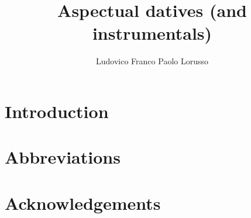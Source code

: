 \documentclass[output=paper]{langsci/langscibook}
\author{Ludovico Franco\affiliation{}\lastand 
Paolo Lorusso\affiliation{}}
\title{Aspectual datives (and instrumentals)}
\begin{document}
\section{Introduction}  
 
\section*{Abbreviations}
\section*{Acknowledgements}

\sloppy
\printbibliography[heading=subbibliography,notkeyword=this] 
\end{document}
